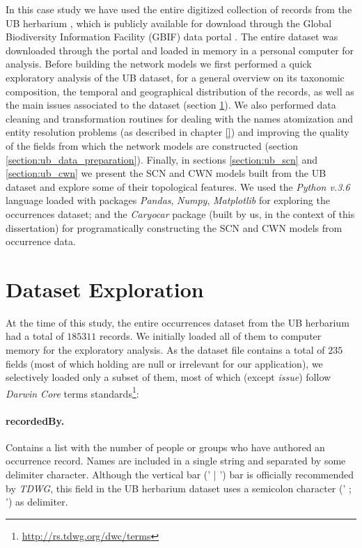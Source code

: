 In this case study we have used the entire digitized collection of records from the UB herbarium \cite{gbif_ubdataset}, which is publicly available for download through the Global Biodiversity Information Facility (GBIF) data portal \cite{gbif}. 
The entire dataset was downloaded through the portal and loaded in memory in a personal computer for analysis.
%
Before building the network models we first performed a quick exploratory analysis of the UB dataset, for a general overview on its taxonomic composition, the temporal and geographical distribution of the records, as well as the main issues associated to the dataset (section \ref{section:ub_exploration}).
We also performed data cleaning and transformation routines for dealing with the names atomization and entity resolution problems (as described in chapter \ref{}) and improving the quality of the fields from which the network models are constructed (section \ref{section:ub_data_preparation}).
Finally, in sections \ref{section:ub_scn} and \ref{section:ub_cwn} we present the SCN and CWN models built from the UB dataset and explore some of their topological features. 
%
We used the \textit{Python v.3.6} language loaded with packages \textit{Pandas}, \textit{Numpy}, \textit{Matplotlib} for exploring the occurrences dataset; and the \textit{Caryocar} package (built by us, in the context of this dissertation) for programatically constructing the SCN and CWN models from occurrence data.





\section{Dataset Exploration}\label{section:ub_exploration}

At the time of this study, the entire occurrences dataset from the UB herbarium had a total of $185311$ records.
We initially loaded all of them to computer memory for the exploratory analysis.
As the dataset file contains a total of $235$ fields (most of which holding are null or irrelevant for our application), we selectively loaded only a subset of them, most of which (except \textit{issue}) follow \textit{Darwin Core} terms standards\footnote{\url{http://rs.tdwg.org/dwc/terms}}:

\paragraph*{recordedBy.} Contains a list with the number of people or groups who have authored an occurrence record. 
Names are included in a single string and separated by some delimiter character. 
Although the vertical bar (' | ') bar is officially recommended by \textit{TDWG}, this field in the UB herbarium dataset uses a semicolon character (' ; ') as delimiter.

